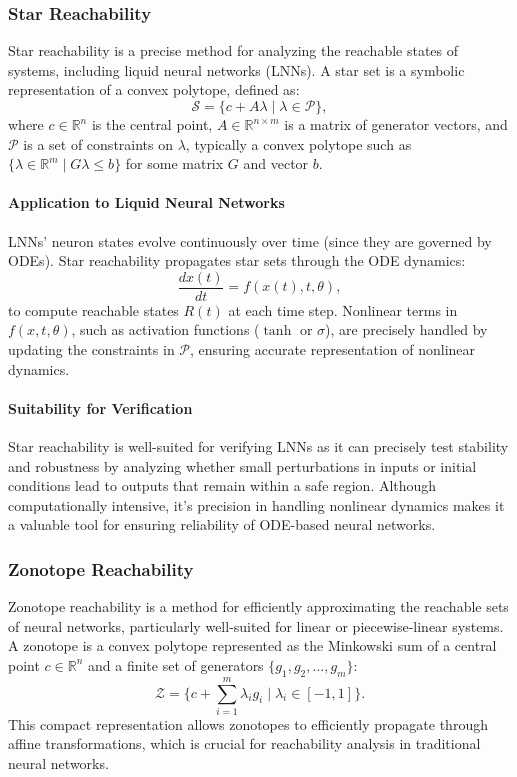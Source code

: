\subsubsection{Star Reachability}

Star reachability is a precise method for analyzing the reachable states of systems, including liquid neural networks (LNNs). A star set is a symbolic representation of a convex polytope, defined as:
\[
\mathcal{S} = \{ c + A\lambda \mid \lambda \in \mathcal{P} \},
\]
where \(c \in \mathbb{R}^n\) is the central point, \(A \in \mathbb{R}^{n \times m}\) is a matrix of generator vectors, and \(\mathcal{P}\) is a set of constraints on \(\lambda\), typically a convex polytope such as \(\{\lambda \in \mathbb{R}^m \mid G\lambda \leq b\}\) for some matrix \(G\) and vector \(b\).

\paragraph{Application to Liquid Neural Networks}
LNNs' neuron states evolve continuously over time (since they are governed by ODEs). Star reachability propagates star sets through the ODE dynamics:
\[
\frac{dx(t)}{dt} = f(x(t), t, \theta),
\]
to compute reachable states \(R(t)\) at each time step. Nonlinear terms in \(f(x, t, \theta)\), such as activation functions (\(\tanh\) or \(\sigma\)), are precisely handled by updating the constraints in \(\mathcal{P}\), ensuring accurate representation of nonlinear dynamics.

\paragraph{Suitability for Verification}
Star reachability is well-suited for verifying LNNs as it can precisely test stability and robustness by analyzing whether small perturbations in inputs or initial conditions lead to outputs that remain within a safe region. Although computationally intensive, it's precision in handling nonlinear dynamics makes it a valuable tool for ensuring reliability of ODE-based neural networks. \cite{tranVerificationRecurrentNeural2023}


\subsubsection{Zonotope Reachability}

Zonotope reachability is a method for efficiently approximating the reachable sets of neural networks, particularly well-suited for linear or piecewise-linear systems. A zonotope is a convex polytope represented as the Minkowski sum of a central point \(c \in \mathbb{R}^n\) and a finite set of generators \(\{g_1, g_2, \dots, g_m\}\):
\[
\mathcal{Z} = \{ c + \sum_{i=1}^m \lambda_i g_i \mid \lambda_i \in [-1, 1] \}.
\]
This compact representation allows zonotopes to efficiently propagate through affine transformations, which is crucial for reachability analysis in traditional neural networks.

